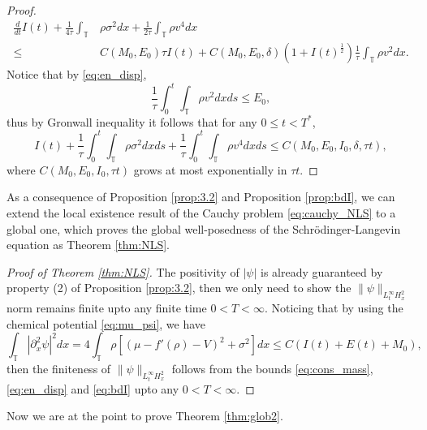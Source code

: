 \documentclass[leqno]{amsart}
\theoremstyle{plain}
\theoremstyle{definition}
\theoremstyle{remark}
\theoremstyle{plain}
\theoremstyle{plain}
\def\T{{\mathbb T}}%
\def\d{{\partial}}
\numberwithin{equation}{section}
\begin{document}
\begin{proof}
\begin{align*}
\frac{d}{dt} I(t)+\frac{1}{4\tau}\int_\T&\rho\sigma^2dx+\frac{1}{2\tau}\int_\T \rho v^4 dx \\
\leq & C(M_0,E_0)\tau I(t)+C(M_0,E_0,\delta)(1+I(t)^\frac12)\frac{1}{\tau}\int_\T \rho v^2dx.
\end{align*}
Notice that by \eqref{eq:en_disp},
\[
\frac{1}{\tau}\int_0^t\int_\T \rho v^2dxds\leq E_0,
\]
thus by Gronwall inequality it follows that for any $0\leq t<T^*$,
\begin{equation}\label{eq:bdI_rs2}
I(t)+\frac{1}{\tau}\int_0^t\int_\T\rho\sigma^2dxds+\frac{1}{\tau}\int_0^t\int_\T \rho v^4 dxds\leq C(M_0,E_0,I_0,\delta,\tau t),
\end{equation}
where $C(M_0,E_0,I_0,\tau t)$ grows at most exponentially in $\tau t$.
\end{proof}

As a consequence of Proposition \ref{prop:3.2} and Proposition \ref{prop:bdI}, we can extend the local existence result of the Cauchy problem \eqref{eq:cauchy_NLS} to a global one, which proves the global well-posedness of the Schr\"odinger-Langevin equation as Theorem \ref{thm:NLS}.

\begin{proof}[Proof of Theorem \ref{thm:NLS}]
The positivity of $|\psi|$ is already guaranteed by property (2) of Proposition \ref{prop:3.2}, then we only need to show the $\|\psi\|_{L^\infty_tH^2_x}$ norm remains finite upto any finite time $0<T<\infty$. Noticing that by using the chemical potential \eqref{eq:mu_psi}, we have
\[
\int_\T|\d_x^2\psi|^2dx=4\int_\T\rho[(\mu-f'(\rho)-V)^2+\sigma^2]dx\leq C(I(t)+E(t)+M_0),
\]
then the finiteness of $\|\psi\|_{L^\infty_tH^2_x}$ follows from the bounds \eqref{eq:cons_mass}, \eqref{eq:en_disp} and \eqref{eq:bdI} upto any $0<T<\infty$.
\end{proof}

Now we are at the point to prove Theorem \ref{thm:glob2}.
\end{document}
